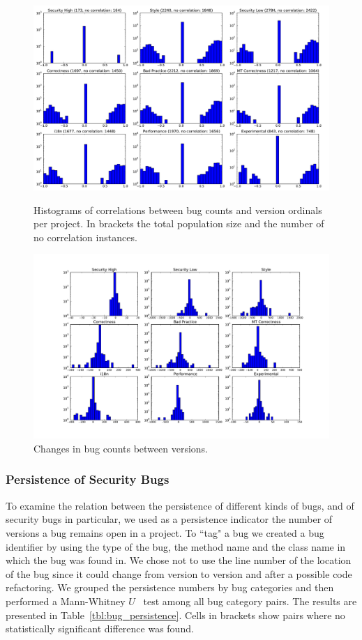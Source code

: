 \documentclass{sig-alternate}
\begin{document}
\begin{figure}[p]
  \centering
  \includegraphics[scale=0.30]{bugsversionscorr}
  \caption{Histograms of correlations between bug counts and version
    ordinals per project. In brackets the total population size and
    the number of no correlation instances.}
  \label{fig:bugsversionscorr}
  \centering
  \includegraphics[scale=0.35]{bugdiffs}
  \caption{Changes in bug counts between versions.}
  \label{fig:bugdiffs}
\end{figure}

\subsubsection{Persistence of Security Bugs}

To examine the relation between the persistence of different kinds of
bugs, and of security bugs in particular, we used as a persistence
indicator the number of versions a bug remains open in a project.
To ``tag" a bug we created a bug identifier by using
the type of the bug, the method name and the class name in which
the bug was found in. We chose not to use the line number
of the location of the bug since it could change from version
to version and after a possible code refactoring.
We grouped the persistence numbers by bug categories and then performed a
Mann-Whitney $U$~\cite{HM98} test among all bug category pairs. The results are
presented in Table~\ref{tbl:bug_persistence}. Cells in brackets show
pairs where no statistically significant difference was found.
\end{document}
